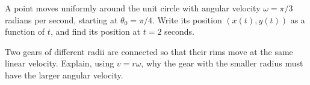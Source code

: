 \begin{exercise}
A point moves uniformly around the unit circle with angular velocity
$\omega = \pi/3$ radians per second, starting at $\theta_0 = \pi/4$. Write
its position $(x(t), y(t))$ as a function of $t$, and find its position at
$t = 2$ seconds.
\end{exercise}

\begin{exercise}
Two gears of different radii are connected so that their rims move at the
same linear velocity. Explain, using $v = r\omega$, why the gear with the
smaller radius must have the larger angular velocity.
\end{exercise}
